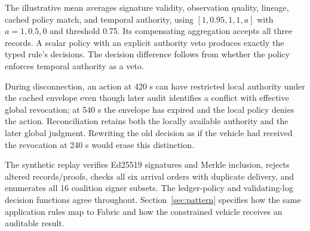 The illustrative mean averages signature validity, observation quality, lineage, cached policy match, and temporal authority, using $[1,0.95,1,1,a]$ with $a=1,0.5,0$ and threshold 0.75. Its compensating aggregation accepts all three records. A scalar policy with an explicit authority veto produces exactly the typed rule's decisions. The decision difference follows from whether the policy enforces temporal authority as a veto.

During disconnection, an action at 420 s can have restricted local authority under the cached envelope even though later audit identifies a conflict with effective global revocation; at 540 s the envelope has expired and the local policy denies the action. Reconciliation retains both the locally available authority and the later global judgment. Rewriting the old decision as if the vehicle had received the revocation at 240 s would erase this distinction.

The synthetic replay verifies Ed25519 signatures and Merkle inclusion, rejects altered records/proofs, checks all six arrival orders with duplicate delivery, and enumerates all 16 coalition signer subsets. The ledger-policy and validating-log decision functions agree throughout. Section~\ref{sec:pattern} specifies how the same application rules map to Fabric and how the constrained vehicle receives an auditable result.
